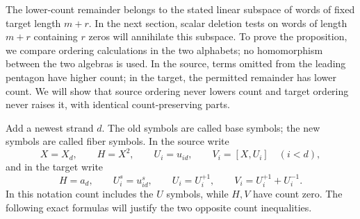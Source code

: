 The lower-count remainder belongs to the stated linear subspace of
words of fixed target length $m+r$.  In the next section, scalar deletion
tests on words of length $m+r$ containing $r$ zeros will annihilate
this subspace.
To prove the proposition, we compare
ordering calculations in the two alphabets; no homomorphism between
the two algebras is used.  In the source, terms omitted from the leading
pentagon have higher count; in the target, the permitted remainder has
lower count.  We will show that source ordering never lowers count and
target ordering never raises it, with identical count-preserving parts.

Add a newest strand $d$.  The old symbols
are called base symbols; the new symbols are called fiber symbols.
In the source write
\[
 X=X_d,\qquad H=X^2,\qquad
 U_i=u_{id},\qquad V_i=[X,U_i]\quad(i<d),
\]
and in the target write
\[
 H=a_d,\qquad U_i^s=u_{id}^s,\qquad
 U_i=U_i^{+1},\qquad V_i=U_i^{+1}+U_i^{-1}.
\]
In this notation count includes the $U$ symbols, while $H,V$ have
count zero.  The following exact formulas will justify the two
opposite count inequalities.

